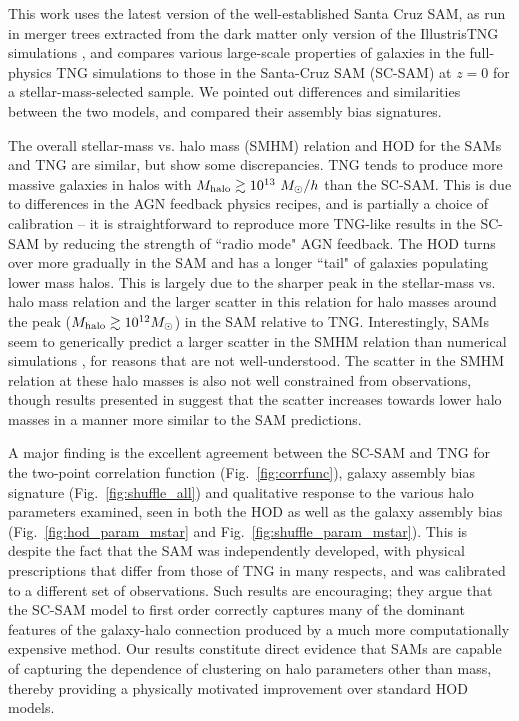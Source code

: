 \documentclass[fleqn,usenatbib]{mnras}
\begin{document}
This work uses the latest version of the well-established Santa Cruz SAM, as run in merger trees extracted from the dark matter only version of the IllustrisTNG simulations \citep{Austen+2021}, and compares various large-scale properties of galaxies in the full-physics TNG simulations to those in the Santa-Cruz SAM (SC-SAM) at $z = 0$ for a stellar-mass-selected sample. We pointed out differences and similarities between the two models, and compared their assembly bias signatures.

The overall stellar-mass vs. halo mass (SMHM) relation and HOD for the SAMs and TNG are similar, but show some discrepancies. TNG tends to produce more massive galaxies in halos with $M_{\rm halo} \gtrsim 10^{13} \ M_\odot/h$ than the SC-SAM. This is due to differences in the AGN feedback physics recipes, and is partially a choice of calibration -- it is straightforward to reproduce more TNG-like results in the SC-SAM by reducing the strength of ``radio mode" AGN feedback. The HOD turns over more gradually in the SAM and has a longer ``tail" of galaxies populating lower mass halos. This is largely due to the sharper peak in the stellar-mass vs. halo mass relation and the larger scatter in this relation for halo masses around the peak ($M_{\rm halo} \gtrsim 10^{12} M_\odot$) in the SAM relative to TNG. Interestingly, SAMs seem to generically predict a larger scatter in the SMHM relation than numerical simulations \citep{2018ARA&A..56..435W}, for reasons that are not well-understood. The scatter in the SMHM relation at these halo masses is also not well constrained from observations, though results presented in \citet{2020MNRAS.498.5080C} suggest that the scatter increases towards lower halo masses in a manner more similar to the SAM predictions. 

A major finding is the excellent agreement between the SC-SAM and TNG for the two-point correlation function (Fig.~\ref{fig:corrfunc}), galaxy assembly bias signature (Fig.~\ref{fig:shuffle_all}) and qualitative response to the various halo parameters examined, seen in both the HOD as well as the galaxy assembly bias (Fig.~\ref{fig:hod_param_mstar} and Fig.~\ref{fig:shuffle_param_mstar}). This is despite the fact that the SAM was independently developed, with physical prescriptions that differ from those of TNG in many respects, and was calibrated to a different set of observations.  Such results are encouraging; they argue that the SC-SAM model to first order correctly captures many of the dominant features of the galaxy-halo connection produced by a much more computationally expensive method. Our results constitute direct evidence that SAMs are capable of capturing the dependence of clustering on halo parameters other than mass, thereby providing a physically motivated improvement over standard HOD models. 
\end{document}
